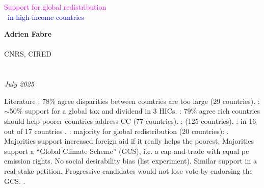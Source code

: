 \documentclass[aspectratio=169,xcolor=dvipsnames, 11pt,mathserif]{beamer}
\begin{document}

\begin{frame}
\thispagestyle{empty}
\begin{center}
\begin{LARGE}
\textcolor{magenta}{Support for global redistribution}\\~\textcolor{blue}{in high-income countries} \end{LARGE}
\vspace{1cm}

\textbf{Adrien Fabre} \\ \quad \\
CNRS, CIRED \\ \quad \\ \quad \\
\textit{July 2025} 
\end{center}
\bigskip
\end{frame}


\begin{frame}{Literature\label{literature}}
\bbvsp
\ip {}: 78\% agree disparities between countries are too large (29 countries).
\ip {}: $\sim$50\% support for a global tax and dividend in 3 HICs.
\ip {}: 79\% agree rich countries should help poorer countries address CC (77 countries).
\ip {}:  (125 countries).
\ip {}:  in 16 out of 17 countries .
\ip {}:  majority  for global redistribution (20 countries):
\bbvsp \ip {}.
\ip Majorities support increased foreign aid if it really helps the poorest.
\ip Majorities support a ``Global Climate Scheme'' (GCS), i.e. a cap-and-trade with equal pc emission rights.
\ip No social desirability bias (list experiment). Similar support in a real-stake petition.
\ip Progressive candidates would not lose vote by endorsing the GCS.
\ip {}.
\ee \ee
\end{frame}
\end{document}
